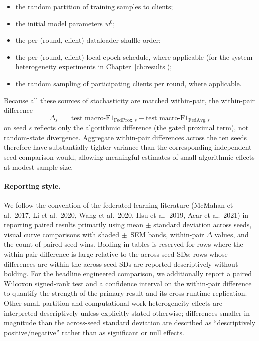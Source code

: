 \documentclass[11pt,a4paper]{report}
\begin{document}
\begin{itemize}
\setlength\itemsep{2pt}
\item the random partition of training samples to clients;
\item the initial model parameters $w^0$;
\item the per-(round, client) dataloader shuffle order;
\item the per-(round, client) local-epoch schedule, where
      applicable (for the system-heterogeneity experiments
      in Chapter~\ref{ch:results});
\item the random sampling of participating clients per round,
      where applicable.
\end{itemize}

Because all these sources of stochasticity are matched
within-pair, the within-pair difference
\[
\Delta_s \;=\; \text{test macro-F1}_{\text{FedProx}, s}
              - \text{test macro-F1}_{\text{FedAvg}, s}
\]
on seed $s$ reflects only the algorithmic difference (the
gated proximal term), not random-state divergence. Aggregate
within-pair differences across the ten seeds therefore have
substantially tighter variance than the corresponding
independent-seed comparison would, allowing meaningful
estimates of small algorithmic effects at modest sample size.

\paragraph{Reporting style.}
We follow the convention of the federated-learning literature
(McMahan et al.\ 2017, Li et al.\ 2020, Wang et al.\ 2020,
Hsu et al.\ 2019, Acar et al.\ 2021) in reporting paired
results primarily using mean $\pm$ standard deviation across
seeds, visual curve comparisons with shaded $\pm$~SEM bands,
within-pair $\Delta$ values, and the count of paired-seed
wins. Bolding in tables is reserved for rows where the
within-pair difference is large relative to the across-seed
SDs; rows whose differences are within the across-seed SDs
are reported descriptively without bolding. For the headline
engineered comparison, we additionally report a paired
Wilcoxon signed-rank test and a confidence interval on the
within-pair difference to quantify the strength of the primary
result and its cross-runtime replication. Other small partition
and computational-work heterogeneity effects are interpreted
descriptively unless explicitly stated otherwise; differences
smaller in magnitude than the across-seed standard deviation
are described as ``descriptively positive/negative'' rather
than as significant or null effects.
\end{document}
